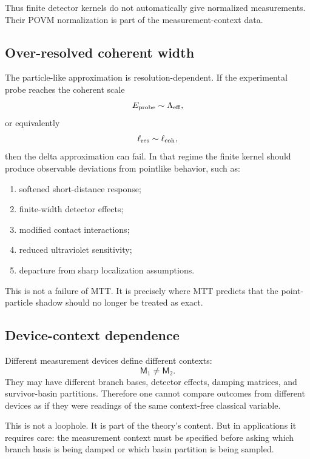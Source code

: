 \documentclass[11pt]{article}
\newcommand{\Meas}{\mathsf M}
\begin{document}
Thus finite detector kernels do not automatically give normalized measurements. Their POVM
normalization is part of the measurement-context data.

\subsection{Over-resolved coherent width}
\label{subsec:failure-over-resolved}

The particle-like approximation is resolution-dependent. If the experimental probe reaches
the coherent scale
\begin{equation}
  E_{\rm probe}\sim\Lambda_{\rm eff},
\end{equation}
or equivalently
\begin{equation}
  \ell_{\rm res}\sim\ell_{\rm coh},
\end{equation}
then the delta approximation can fail. In that regime the finite kernel should produce
observable deviations from pointlike behavior, such as:
\begin{enumerate}[label=(\roman*)]
  \item softened short-distance response;
  \item finite-width detector effects;
  \item modified contact interactions;
  \item reduced ultraviolet sensitivity;
  \item departure from sharp localization assumptions.
\end{enumerate}

This is not a failure of MTT. It is precisely where MTT predicts that the point-particle shadow
should no longer be treated as exact.

\subsection{Device-context dependence}
\label{subsec:failure-device-context}

Different measurement devices define different contexts:
\begin{equation}
  \Meas_1\neq \Meas_2.
\end{equation}
They may have different branch bases, detector effects, damping matrices, and survivor-basin
partitions. Therefore one cannot compare outcomes from different devices as if they were
readings of the same context-free classical variable.

This is not a loophole. It is part of the theory's content. But in applications it requires care:
the measurement context must be specified before asking which branch basis is being damped
or which basin partition is being sampled.
\end{document}
